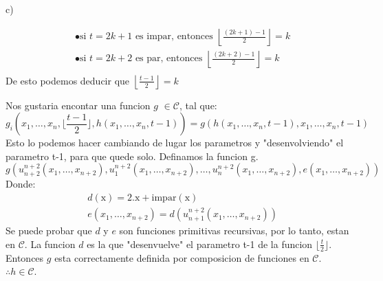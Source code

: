 \documentclass{report}
\begin{document}
\sol c)
\begin{myproof}
	\begin{align*}
		 & \bullet \text{si } t = 2k + 1 \text{ es impar, entonces } \left\lfloor \frac{(2k+1)-1}{2} \right\rfloor = k \\
		 & \bullet \text{si } t = 2k + 2 \text{ es par, entonces } \left\lfloor \frac{(2k+2)-1}{2} \right\rfloor = k   \\
	\end{align*}De esto podemos deducir que $\left\lfloor \frac{t-1}{2} \right\rfloor = k$
\end{myproof}
\begin{myproof}
	Nos gustaria encontar una funcion $g$ $\in \mathcal{C}$, tal que: $$g_i(x_1,\ldots,x_n,\lfloor\frac{t-1}2\rfloor,h(x_1,\ldots,x_n,t-1))=g(h(x_1,\ldots,x_n,t-1),x_1,\ldots,x_n,t-1)$$
	Esto lo podemos hacer cambiando de lugar los parametros y "desenvolviendo" el parametro t-1, para que quede solo. Definamos la funcion g.
	$$g(u_{n+2}^{n+2}(x_1,\ldots,x_{n+2}),u_1^{n+2}(x_1,\ldots,x_{n+2}),\ldots,u_{n}^{n+2}(x_1,\ldots,x_{n+2}),e(x_1,\ldots,x_{n+2}))$$Donde:
	$$\begin{aligned}&d(\mathrm{x})=2.\mathrm{x}+\mathrm{impar}(\mathrm{x})\\&e(x_1,\ldots,x_{n+2})=d(u_{n+1}^{n+2}(x_1,\ldots,x_{n+2}))\end{aligned}$$Se puede probar que $d$ y $e$ son funciones primitivas recursivas, por lo tanto, estan en $\mathcal{C}$.
	La funcion $d$ es la que "desenvuelve" el parametro t-1 de la funcion $\lfloor\frac{t}2\rfloor$. Entonces $g$ esta correctamente definida por composicion de funciones en $\mathcal{C}$.
	$\therefore h \in \mathcal{C}$.
\end{myproof}
\end{document}
